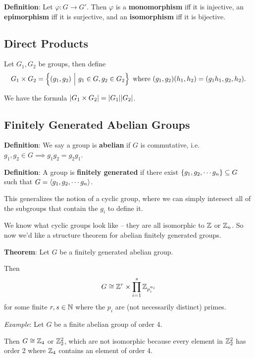 \textbf{Definition}: Let \(\varphi: G \to G'\). Then \(\varphi\) is a
\textbf{monomorphism} iff it is injective, an \textbf{epimorphism} iff
it is surjective, and an \textbf{isomorphism} iff it is bijective.

\hypertarget{direct-products}{%
\subsection{Direct Products}\label{direct-products}}

Let \(G_1, G_2\) be groups, then define
\begin{align*}
G_1 \times G_2 = \left\{{(g_1, g_2) {~\mathrel{\Big|}~} g_1 \in G, g_2 \in G_2}\right\} \text{ where } (g_1, g_2)(h_1, h_2) = (g_1 h_1, g_2 ,h_2).
\end{align*}

We have the formula \({\left\lvert {G_1 \times G_2} \right\rvert} = {\left\lvert {G_1} \right\rvert} {\left\lvert {G_2} \right\rvert}\).

\hypertarget{finitely-generated-abelian-groups}{%
\subsection{Finitely Generated Abelian
Groups}\label{finitely-generated-abelian-groups}}

\textbf{Definition}: We say a group is \textbf{abelian} if \(G\) is
commutative, i.e.~\(g_1, g_2 \in G \implies g_1 g_2 = g_2 g_1\).

\textbf{Definition}: A group is \textbf{finitely generated} if there
exist \(\left\{{g_1, g_2, \cdots g_n}\right\} \subseteq G\) such that
\(G = \left\langle{g_1, g_2, \cdots g_n}\right\rangle\).

This generalizes the notion of a cyclic group, where we can simply
intersect all of the subgroups that contain the \(g_i\) to define it.

We know what cyclic groups look like -- they are all isomorphic to
\({\mathbb{Z}}\) or \({\mathbb{Z}}_n\). So now we'd like a structure theorem for abelian
finitely generated groups.

\textbf{Theorem}: Let \(G\) be a finitely generated abelian group.

Then
\begin{align*}G \cong {\mathbb{Z}}^r \times \displaystyle\prod_{i=1}^s {\mathbb{Z}}_{p_i^{\alpha _i}}\end{align*}
for some finite \(r,s \in {\mathbb{N}}\) where the \(p_i\) are (not necessarily
distinct) primes.

\emph{Example}: Let \(G\) be a finite abelian group of order 4.

Then \(G \cong {\mathbb{Z}}_4\) or \({\mathbb{Z}}_2^2\), which are not isomorphic because
every element in \({\mathbb{Z}}_2^2\) has order 2 where \({\mathbb{Z}}_4\) contains an
element of order 4.

